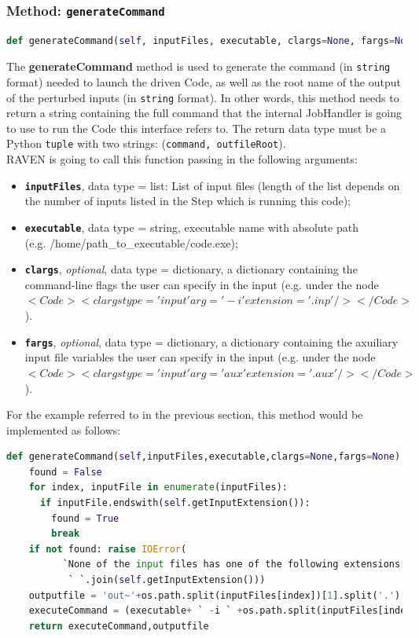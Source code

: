 \subsubsection{Method: \texttt{generateCommand}}
\label{subsubsec:generateCommand}
\begin{lstlisting}[language=python]
def generateCommand(self, inputFiles, executable, clargs=None, fargs=None)
\end{lstlisting} 
The \textbf{generateCommand} method is used to generate the command 
(in \texttt{string} format) needed to launch the driven Code, as well as the root name of the output of the perturbed inputs (in \texttt{string} format).
 In other words, this 
method needs to return a string containing the full command 
that the internal JobHandler is going to use to run the Code this interface refers to. 
The return data type must be a Python \texttt{tuple} with two strings: (\texttt{command, outfileRoot}).
\\RAVEN is going to call this function passing in the following arguments:
\begin{itemize}
  \item \textbf{\texttt{inputFiles}}, data type = list: List of input files (length of the list depends on the 
           number of inputs listed in the Step which is running this code);
  \item \textbf{\texttt{executable}}, data type = string, executable name with absolute 
            path \\(e.g. /home/path\_to\_executable/code.exe);
  \item  \textbf{\texttt{clargs}}, \emph{optional}, data type = dictionary, a dictionary containing the command-line flags the 
               user can specify in the input (e.g. under the node $<Code><clargs type='input' arg='-i' extension='.inp'/></Code>$).
  \item  \textbf{\texttt{fargs}}, \emph{optional}, data type = dictionary, a dictionary containing the axuiliary input file variables the 
               user can specify in the input (e.g. under the node $<Code><clargs type='input' arg='aux' extension='.aux'/></Code>$).
\end{itemize}
For the example referred to in the previous section, this method would be implemented as follows:
\newline
\begin{lstlisting}[language=python]
  def generateCommand(self,inputFiles,executable,clargs=None,fargs=None):
    found = False
    for index, inputFile in enumerate(inputFiles):
      if inputFile.endswith(self.getInputExtension()):
        found = True
        break
    if not found: raise IOError(
          `None of the input files has one of the following extensions: ` +
           ` `.join(self.getInputExtension()))
    outputfile = 'out~'+os.path.split(inputFiles[index])[1].split('.')[0]
    executeCommand = (executable+ ` -i ` +os.path.split(inputFiles[index])[1])
    return executeCommand,outputfile
\end{lstlisting} 


